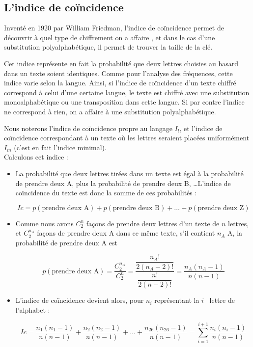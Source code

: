 \subsection{L'indice de coïncidence}
Inventé en 1920 par William Friedman, l'indice de coïncidence
permet de découvrir à quel type de chiffrement on a affaire 
, et dans le cas d'une
substitution polyalphabétique, il permet de trouver la taille de
la clé.

Cet indice représente en fait la probabilité que deux lettres
choisies au hasard dans un texte soient identiques. Comme pour
l'analyse des fréquences, cette indice varie selon la langue.
Ainsi, si l'indice de coïncidence d'un texte chiffré correspond à
celui d'une certaine langue, le texte est chiffré avec une
substitution monoalphabétique ou une transposition dans cette 
langue. Si par contre l'indice ne correspond à rien, on a affaire 
à une substitution polyalphabétique.

Nous noterons l'indice de coïncidence propre au langage $I_l$, et
l'indice de coïncidence correspondant à un texte où les lettres
seraient placées uniformément $I_m$ (c'est en fait l'indice
minimal). 
\\

Calculons cet indice :
\begin{itemize}
  \item La probabilité que deux lettres tirées dans un texte est
égal à la probabilité de prendre deux A, plus la probabilité de
prendre deux B, \dots L'indice de coïncidence du texte est donc la
somme de ces probabilités :
  \begin{center}
    \[ Ic = p(\mbox{prendre deux A}) + p(\mbox{prendre deux B}) +
\dots + p(\mbox{prendre deux Z}) \]
  \end{center}
  \item Comme nous avons $C^{n}_2$ façons de prendre deux lettres
d'un texte de $n$ lettres, et $C^{n_A}_2$ façons de prendre deux A
dans ce même texte, s'il contient $n_A$ A, la probabilité de prendre 
deux A est
  \begin{center}
    \[ p(\mbox{prendre deux A}) = \dfrac{C^{n_A}_2}{C^{n}_2} =
\dfrac{\dfrac{n_A!}{2 (n_A - 2)!}}{\dfrac{n!}{2 (n - 2)!}} = 
\dfrac{n_A (n_A - 1)}{n (n - 1)} \]
  \end{center}
  \item L'indice de coïncidence devient alors, pour $n_i$
représentant la $i$\ieme~ lettre de l'alphabet :
  \begin{center}
    \[ Ic = \frac{n_1 (n_1 - 1)}{n (n - 1)} + \frac{n_2 (n_2 - 1)}{n
(n - 1)} + \dots + \frac{n_{26} (n_{26} - 1)}{n (n - 1)} = \sum_{i = 1}^{i
+ 1} \frac{n_i (n_i - 1)}{n (n - 1)} \] 
  \end{center}
\end{itemize}

